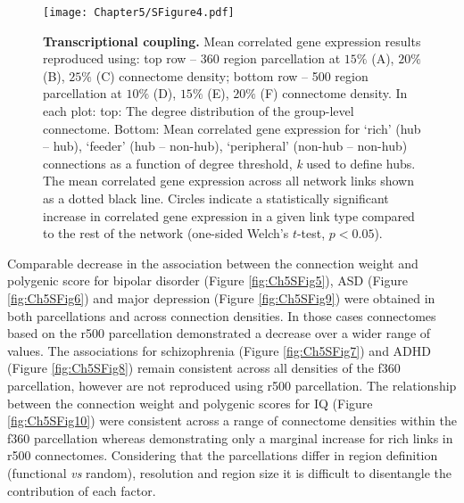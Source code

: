\begin{figure}[h!]
\begin{center}
\texttt{[image: Chapter5/SFigure4.pdf]}%
\end{center}
\caption{\textbf{Transcriptional coupling.}
Mean correlated gene expression results reproduced using: top row -- 360 region parcellation at $15\%$ (A), $20\%$ (B), $25\%$ (C) connectome density; bottom row -- 500 region parcellation at $10\%$ (D), $15\%$ (E), $20\%$ (F) connectome density. In each plot: top: The degree distribution of the group-level connectome. Bottom: Mean correlated gene expression for `rich' (hub -- hub), `feeder' (hub -- non-hub), `peripheral' (non-hub -- non-hub) connections as a function of degree threshold, \textit{k} used to define hubs. The mean correlated gene expression across all network links shown as a dotted black line. Circles indicate a statistically significant increase in correlated gene expression in a given link type compared to the rest of the network (one-sided Welch's $t$-test, $p < 0.05$).}
\label{fig:Ch5SFig4}
\end{figure}

\clearpage
Comparable decrease in the association between the connection weight and polygenic score for bipolar disorder (Figure \ref{fig:Ch5SFig5}), ASD (Figure \ref{fig:Ch5SFig6}) and major depression (Figure \ref{fig:Ch5SFig9}) were obtained in both parcellations and across connection densities. In those cases connectomes based on the r500 parcellation demonstrated a decrease over a wider range of values. The associations for schizophrenia (Figure \ref{fig:Ch5SFig7}) and ADHD (Figure \ref{fig:Ch5SFig8}) remain consistent across all densities of the f360 parcellation, however are not reproduced using r500 parcellation. The relationship between the connection weight and polygenic scores for IQ (Figure \ref{fig:Ch5SFig10}) were consistent across a range of connectome densities within the f360 parcellation whereas demonstrating only a marginal increase for rich links in r500 connectomes. Considering that the parcellations differ in region definition (functional \textit{vs} random), resolution and region size it is difficult to disentangle the contribution of each factor.

